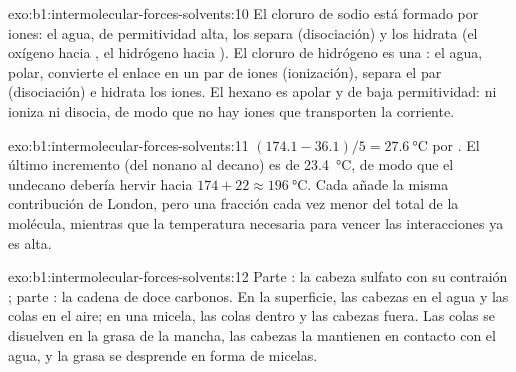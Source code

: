 \begin{solution}{exo:b1:intermolecular-forces-solvents:10}
El cloruro de sodio está formado por iones: el agua, de permitividad
alta, los separa (disociación) y los hidrata (el oxígeno hacia
, el hidrógeno hacia ). El cloruro de hidrógeno es una
: el agua, polar, convierte el enlace  en un par
de iones  (ionización), separa el par (disociación) e
hidrata los iones. El hexano es apolar y de baja permitividad: ni ioniza
ni disocia, de modo que no hay iones que transporten la corriente.
\end{solution}

\begin{solution}{exo:b1:intermolecular-forces-solvents:11}
$(174.1 - 36.1)/5 = \qty{27.6}{\celsius}$ por . El último
incremento (del nonano al decano) es de \qty{23.4}{\celsius}, de modo que
el undecano debería hervir hacia $174 + 22 \approx \qty{196}{\celsius}$.
Cada  añade la misma contribución de London, pero una fracción
cada vez menor del total de la molécula, mientras que la temperatura
necesaria para vencer las interacciones ya es alta.
\end{solution}

\begin{solution}{exo:b1:intermolecular-forces-solvents:12}
Parte : la cabeza sulfato  con su contraión
; parte : la cadena de doce carbonos. En la superficie,
las cabezas en el agua y las colas en el aire; en una micela, las colas
dentro y las cabezas fuera. Las colas se disuelven en la grasa de la
mancha, las cabezas la mantienen en contacto con el agua, y la grasa se
desprende en forma de micelas.
\end{solution}

